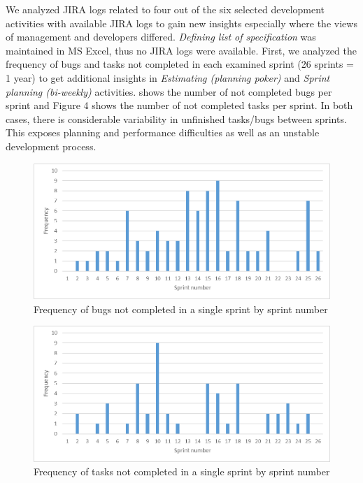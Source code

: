 We analyzed JIRA logs related to four out of the six selected development activities with available JIRA logs to gain new insights especially where the views of management and developers differed. \emph{Defining list of specification} was maintained in MS Excel, thus no JIRA logs were available. First, we analyzed the frequency of bugs and tasks not completed in each examined sprint (26 sprints = 1 year) to get additional insights in \emph{Estimating (planning poker)} and \emph{Sprint planning (bi-weekly)} activities.  shows the number of not completed bugs per sprint and Figure 4 shows the number of not completed tasks per sprint. In both cases, there is considerable variability in unfinished tasks/bugs between sprints. This exposes planning and performance difficulties as well as an unstable development process. 


\begin{figure}
	\centering
	\includegraphics[width=\linewidth]{figures/frequency-of-bugs}
	\caption{Frequency of bugs not completed in a single sprint by sprint number}
	\label{fig:frequency-of-bugs}
\end{figure}

\begin{figure}
	\centering
	\includegraphics[width=\linewidth]{figures/frequency-of-tasks}
	\caption{Frequency of tasks not completed in a single sprint by sprint number}
	\label{fig:frequency-of-tasks}
\end{figure}


